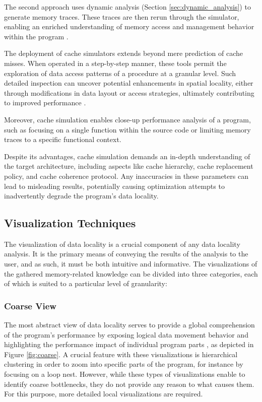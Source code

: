 The second approach uses dynamic analysis (Section \ref{sec:dynamic_analysis}) to generate memory traces. These traces are then rerun through the simulator, enabling an enriched understanding of memory access and management behavior within the program \cite{choudhury2011abstract}.

The deployment of cache simulators extends beyond mere prediction of cache misses. When operated in a step-by-step manner, these tools permit the exploration of data access patterns of a procedure at a granular level. Such detailed inspection can uncover potential enhancements in spatial locality, either through modifications in data layout or access strategies, ultimately contributing to improved performance \cite{schaad2022boosting,hammer2017kerncraft,choudhury2011abstract}.

Moreover, cache simulation enables close-up performance analysis of a program, such as focusing on a single function within the source code or limiting memory traces to a specific functional context.

Despite its advantages, cache simulation demands an in-depth understanding of the target architecture, including aspects like cache hierarchy, cache replacement policy, and cache coherence protocol. Any inaccuracies in these parameters can lead to misleading results, potentially causing optimization attempts to inadvertently degrade the program's data locality.

\subsection{Visualization Techniques}\label{sec:visualization}

The visualization of data locality is a crucial component of any data locality analysis. It is the primary means of conveying the results of the analysis to the user, and as such, it must be both intuitive and informative. The visualizations of the gathered memory-related knowledge can be divided into three categories, each of which is suited to a particular level of granularity:

\subsubsection{Coarse View}\label{sec:coarse_view}
The most abstract view of data locality serves to provide a global comprehension of the program's performance by exposing logical data movement behavior and highlighting the performance impact of individual program parts \cite{schaad2021boosting,schaad2022boosting,gimenez2017memaxes,adhianto2010hpctoolkit}, as depicted in Figure \ref{fig:coarse}.
A crucial feature with these visualizations is hierarchical clustering in order to zoom into specific parts of the program, for instance by focusing on a loop nest. However, while these types of visualizations enable to identify coarse bottlenecks, they do not provide any reason to what causes them. For this purpose, more detailed local visualizations are required.

